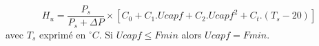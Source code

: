 \[
H_u = \frac{P_s}{P_s + \Delta P} \times 
      \left[ C_0 + C_1.Ucapf + C_2.Ucapf^2 + 
       C_t.(T_s - 20 ) \right]
\]
avec $T_s$ exprim\'e en $^\circ C$. \newline
Si $Ucapf \le Fmin$ alors $Ucapf = Fmin $.

